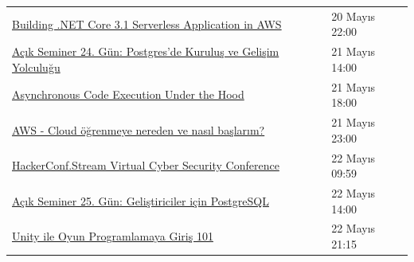 \documentclass[11pt]{article}
\begin{document}
\begin{longtable}{|p{9.5cm}|l|}
\href{https://kommunity.com/bilge-adam-teknoloji/events/building-net-core-31-serverless-application-in-aws-5c948e36}{Building .NET Core 3.1 Serverless Application in AWS} & 20 Mayıs 22:00\\
\href{https://kommunity.com/tracikkaynak/events/acik-seminer-24-gun-postgresde-kurulus-ve-gelisim-yolculugu-80e1191a}{Açık Seminer 24. Gün: Postgres’de Kuruluş ve Gelişim Yolculuğu} & 21 Mayıs 14:00\\
\href{https://kommunity.com/frontend-istanbul/events/asynchronous-code-execution-under-the-hood-605ea817}{Asynchronous Code Execution Under the Hood} & 21 Mayıs 18:00\\
\href{https://kommunity.com/cloud-and-serverless-turkey/events/ramazan-ozel-9-aws-cloud-ogrenmeye-nereden-ve-nasil-baslarim-7d516704}{AWS - Cloud öğrenmeye nereden ve nasıl başlarım?} & 21 Mayıs 23:00\\
\href{https://kommunity.com/mdisec-cyber-security-twitch-streams/events/hackerconfstream-virtual-cyber-security-conference-b7bd6be7}{HackerConf.Stream Virtual Cyber Security Conference} & 22 Mayıs 09:59\\
\href{https://kommunity.com/tracikkaynak/events/acik-seminer-25-gun-gelistiriciler-icin-postgresql-e7c76ef0}{Açık Seminer 25. Gün: Geliştiriciler için PostgreSQL} & 22 Mayıs 14:00\\
\href{https://kommunity.com/mavidurakio/events/s1e43-unity-ile-oyun-programlamaya-giris-101-23658c44}{Unity ile Oyun Programlamaya Giriş 101} & 22 Mayıs 21:15\\
\hline
\end{longtable}
\end{document}
